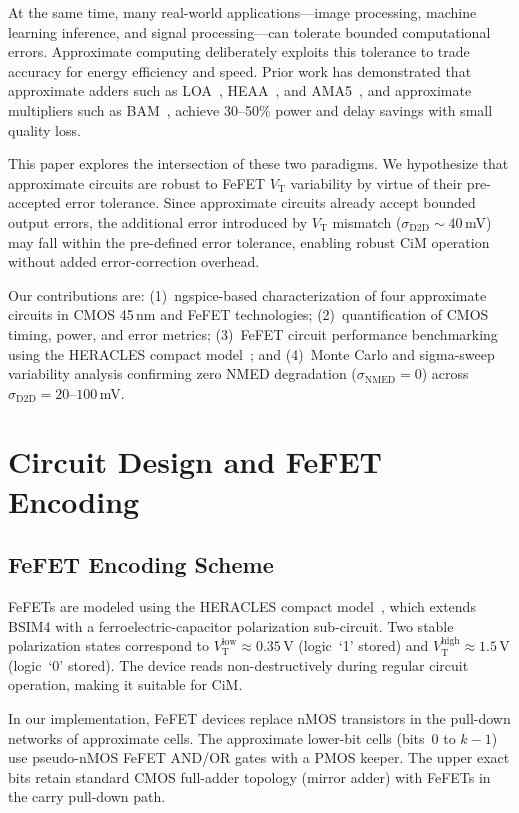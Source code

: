\documentclass[letterpaper, 10 pt, conference]{ieeeconf}  %
\newcommand{\VT}{V_{\mathrm{T}}}
\newcommand{\sigDD}{\sigma_{\mathrm{D2D}}}
\newcommand{\sigNMED}{\sigma_{\mathrm{NMED}}}
\begin{document}
At the same time, many real-world applications---image processing, machine
learning inference, and signal processing---can tolerate bounded computational
errors. Approximate computing deliberately exploits this tolerance to trade
accuracy for energy efficiency and speed. Prior work has demonstrated that
approximate adders such as LOA~\cite{gupta2013loa}, HEAA~\cite{ye2013heaa},
and AMA5~\cite{almurib2018ama5}, and approximate multipliers such as
BAM~\cite{momeni2015bam}, achieve 30--50\% power and delay savings with small
quality loss.

This paper explores the intersection of these two paradigms. We hypothesize
that approximate circuits are robust to FeFET $\VT$ variability by virtue of
their pre-accepted error tolerance. Since approximate circuits already accept
bounded output errors, the additional error introduced by $\VT$ mismatch
($\sigDD \sim 40$\,mV) may fall within the pre-defined error tolerance,
enabling robust CiM operation without added error-correction overhead.

Our contributions are: (1)~ngspice-based characterization of four approximate
circuits in CMOS 45\,nm and FeFET technologies; (2)~quantification of CMOS
timing, power, and error metrics; (3)~FeFET circuit performance benchmarking
using the HERACLES compact model~\cite{heracles2022}; and (4)~Monte Carlo and
sigma-sweep variability analysis confirming zero NMED degradation
($\sigNMED = 0$) across $\sigDD = 20$--$100$\,mV.


\section{Circuit Design and FeFET Encoding}

\subsection{FeFET Encoding Scheme}

FeFETs are modeled using the HERACLES compact model~\cite{heracles2022}, which
extends BSIM4 with a ferroelectric-capacitor polarization sub-circuit. Two
stable polarization states correspond to $\VT^{\mathrm{low}} \approx 0.35$\,V
(logic~`1' stored) and $\VT^{\mathrm{high}} \approx 1.5$\,V (logic~`0'
stored). The device reads non-destructively during regular circuit operation,
making it suitable for CiM.

In our implementation, FeFET devices replace nMOS transistors in the pull-down
networks of approximate cells. The approximate lower-bit cells (bits~0 to
$k{-}1$) use pseudo-nMOS FeFET AND/OR gates with a PMOS keeper. The upper
exact bits retain standard CMOS full-adder topology (mirror adder) with FeFETs
in the carry pull-down path.
\end{document}
